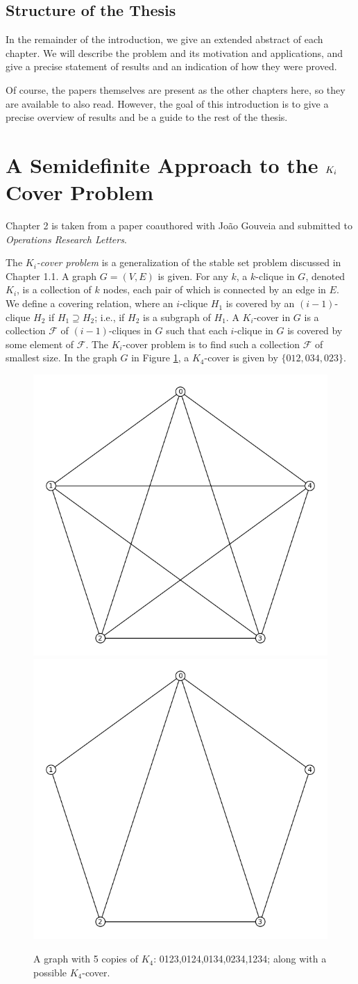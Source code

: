 \subsection{Structure of the Thesis}
In the remainder of the introduction, we give an extended abstract of each
chapter. We will describe the problem and its motivation and applications,
and give a precise statement of results and an indication of how they were 
proved.

Of course, the papers themselves are present as the other chapters here, so
they are available to also read. However, the goal of this introduction
is to give a precise overview of results and be a guide to the rest of the
thesis.

\section{A Semidefinite Approach to the $K_\MakeLowercase{i}$ Cover Problem}
Chapter 2 is taken from a paper coauthored with Jo\~ao Gouveia and submitted to 
\emph{Operations Research Letters}. 

The {\em $K_i$-cover problem} is a generalization of the stable set problem discussed
in Chapter 1.1. A graph $G = (V,E)$ is given. For any $k$, a $k$-clique in $G$,
denoted $K_i$,
is a collection of $k$ nodes, each pair of which is connected by an edge in $E$.
We define a covering relation, where an $i$-clique $H_1$ is covered by an 
$(i-1)$-clique $H_2$ if $H_1 \supseteq H_2$; i.e., if $H_2$ is a subgraph of
$H_1$. A $K_i$-cover in $G$ is a
collection $\mathcal{F}$ of $(i-1)$-cliques in $G$ such that each $i$-clique in $G$
is covered by some element of $\mathcal{F}$. The $K_i$-cover problem is to find such a
collection $\mathcal{F}$ of smallest size.
In the graph $G$ in Figure \ref{K5}, a $K_4$-cover is given by $\{012,034,023\}$.

\begin{figure}[htd]
	\centering
	\includegraphics[width=.4\textwidth,natwidth=613,natheight=584]{K5.png}
	\includegraphics[width=.4\textwidth,natwidth=613,natheight=584]{K4cover.png}
	\caption{A graph with 5 copies of $K_4$: 0123,0124,0134,0234,1234; along with a possible $K_4$-cover.}
	\label{K5}
\end{figure}

